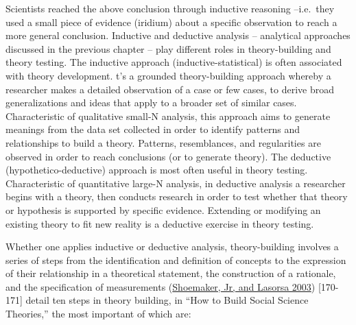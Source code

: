 \documentclass{book}
\begin{document}
Scientists reached the above conclusion through inductive reasoning
--i.e.~they used a small piece of evidence (iridium) about a specific
observation to reach a more general conclusion. Inductive and deductive
analysis -- analytical approaches discussed in the previous chapter -- play
different roles in theory-building and theory testing. The inductive approach
(inductive-statistical) is often associated with theory development. t's a
grounded theory-building approach whereby a researcher makes a detailed
observation of a case or few cases, to derive broad generalizations and ideas
that apply to a broader set of similar cases. Characteristic of qualitative
small-N analysis, this approach aims to generate meanings from the data set
collected in order to identify patterns and relationships to build a theory.
Patterns, resemblances, and regularities are observed in order to reach
conclusions (or to generate theory). The deductive (hypothetico-deductive)
approach is most often useful in theory testing. Characteristic of
quantitative large-N analysis, in deductive analysis a researcher begins with
a theory, then conducts research in order to test whether that theory or
hypothesis is supported by specific evidence. Extending or modifying an
existing theory to fit new reality is a deductive exercise in theory testing.

Whether one applies inductive or deductive analysis, theory-building involves
a series of steps from the identification and definition of concepts to the
expression of their relationship in a theoretical statement, the construction
of a rationale, and the specification of measurements
(\protect\hyperlink{ref-shoemakerHowBuildSocial2003}{Shoemaker, Jr, and
Lasorsa 2003}) {[}170-171{]} detail ten steps in theory building, in ``How to
Build Social Science Theories,'' the most important of which are:
\end{document}
